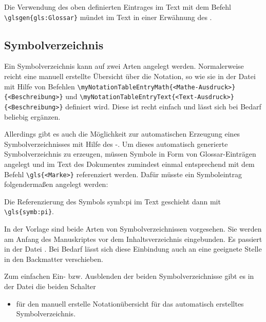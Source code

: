 Die Verwendung des oben definierten Eintrages im Text mit dem Befehl
\lstinline|\glsgen{gls:Glossar}| mündet im Text in einer Erwähnung des .


\subsection{Symbolverzeichnis}%
%
%
%
\label{sec:Symbolverz}
%
Ein Symbolverzeichnis kann auf zwei Arten angelegt werden.
Normalerweise reicht eine manuell erstellte Übersicht über die Notation,
so wie sie in der Datei 
mit Hilfe von Befehlen
\lstinline|\myNotationTableEntryMath{<Mathe-Ausdruck>}{<Beschreibung>}|
und
\lstinline|\myNotationTableEntryText{<Text-Ausdruck>}{<Beschreibung>}|
definiert wird.
Diese ist recht einfach und lässt sich bei Bedarf beliebig ergänzen.

Allerdings gibt es auch die Möglichkeit zur automatischen Erzeugung eines
Symbolverzeichnisses mit Hilfe des -.
Um dieses automatisch generierte Symbolverzeichnis zu erzeugen,
müssen Symbole in Form von Glossar-Einträgen angelegt und im Text des Dokumentes
zumindest einmal entsprechend mit dem Befehl \lstinline|\gls{<Marke>}| referenziert werden.
Dafür müsste ein Symboleintrag folgendermaßen angelegt werden:
\begin{latex}[caption={Definition eines Symboleintrages},label={lst:SymbEntry}]
\end{latex}
Die Referenzierung des Symbols \gls{symb:pi} im Text geschieht dann mit 
\lstinline|\gls{symb:pi}|.

In der Vorlage sind beide Arten von Symbolverzeichnissen vorgesehen.
Sie werden am Anfang des Manuskriptes vor dem Inhaltsverzeichnis eingebunden.
Es passiert in der Datei .
Bei Bedarf lässt sich diese Einbindung auch an eine geeignete Stelle in den Backmatter verschieben.

Zum einfachen Ein- bzw. Ausblenden der beiden Symbolverzeichnisse
gibt es in der Datei 
die beiden Schalter
\begin{itemize}
\item {} für den manuell erstelle Notationübersicht
 für das automatisch erstelltes Symbolverzeichnis.
\end{itemize}



